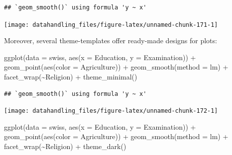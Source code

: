 \documentclass[
  12pt,
]{style/krantz}
\newenvironment{Shaded}{\begin{snugshade}}{\end{snugshade}}
\newcommand{\AttributeTok}[1]{\textcolor[rgb]{0.77,0.63,0.00}{#1}}
\newcommand{\FunctionTok}[1]{\textcolor[rgb]{0.00,0.00,0.00}{#1}}
\newcommand{\NormalTok}[1]{#1}
\newcommand{\SpecialCharTok}[1]{\textcolor[rgb]{0.00,0.00,0.00}{#1}}
\newcommand{\StringTok}[1]{\textcolor[rgb]{0.31,0.60,0.02}{#1}}
\begin{document}
\begin{verbatim}
## `geom_smooth()` using formula 'y ~ x'
\end{verbatim}

\texttt{[image: datahandling\_files/figure-latex/unnamed-chunk-171-1]}

Moreover, several theme-templates offer ready-made designs for plots:

\begin{Shaded}
\begin{Highlighting}[]
\FunctionTok{ggplot}\NormalTok{(}\AttributeTok{data =}\NormalTok{ swiss, }\FunctionTok{aes}\NormalTok{(}\AttributeTok{x =}\NormalTok{ Education, }\AttributeTok{y =}\NormalTok{ Examination)) }\SpecialCharTok{+} 
     \FunctionTok{geom\_point}\NormalTok{(}\FunctionTok{aes}\NormalTok{(}\AttributeTok{color =}\NormalTok{ Agriculture)) }\SpecialCharTok{+}
     \FunctionTok{geom\_smooth}\NormalTok{(}\AttributeTok{method =} \StringTok{\textquotesingle{}lm\textquotesingle{}}\NormalTok{) }\SpecialCharTok{+}
     \FunctionTok{facet\_wrap}\NormalTok{(}\SpecialCharTok{\textasciitilde{}}\NormalTok{Religion) }\SpecialCharTok{+}
     \FunctionTok{theme\_minimal}\NormalTok{()}
\end{Highlighting}
\end{Shaded}

\begin{verbatim}
## `geom_smooth()` using formula 'y ~ x'
\end{verbatim}

\texttt{[image: datahandling\_files/figure-latex/unnamed-chunk-172-1]}

\begin{Shaded}
\begin{Highlighting}[]
\FunctionTok{ggplot}\NormalTok{(}\AttributeTok{data =}\NormalTok{ swiss, }\FunctionTok{aes}\NormalTok{(}\AttributeTok{x =}\NormalTok{ Education, }\AttributeTok{y =}\NormalTok{ Examination)) }\SpecialCharTok{+} 
     \FunctionTok{geom\_point}\NormalTok{(}\FunctionTok{aes}\NormalTok{(}\AttributeTok{color =}\NormalTok{ Agriculture)) }\SpecialCharTok{+}
     \FunctionTok{geom\_smooth}\NormalTok{(}\AttributeTok{method =} \StringTok{\textquotesingle{}lm\textquotesingle{}}\NormalTok{) }\SpecialCharTok{+}
     \FunctionTok{facet\_wrap}\NormalTok{(}\SpecialCharTok{\textasciitilde{}}\NormalTok{Religion) }\SpecialCharTok{+}
     \FunctionTok{theme\_dark}\NormalTok{()}
\end{Highlighting}
\end{Shaded}
\end{document}
